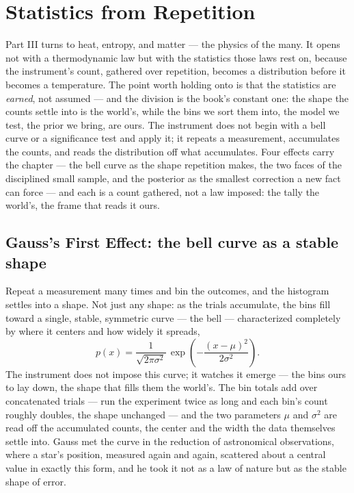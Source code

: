 \chapter{Statistics from Repetition}
\label{chap:statistics-from-repetition}

Part III turns to heat, entropy, and matter --- the physics of the many. It opens not with a thermodynamic
law but with the statistics those laws rest on, because the instrument's count, gathered over repetition,
becomes a distribution before it becomes a temperature. The point worth holding onto is that the statistics
are \emph{earned}, not assumed --- and the division is the book's constant one: the shape the counts settle
into is the world's, while the bins we sort them into, the model we test, the prior we bring, are ours. The
instrument does not begin with a bell curve or a significance test and apply it; it repeats a measurement,
accumulates the counts, and reads the distribution off what accumulates. Four effects carry the chapter --- the
bell curve as the shape repetition makes, the two faces of the disciplined small sample, and the posterior as
the smallest correction a new fact can force --- and each is a count gathered, not a law imposed: the tally the
world's, the frame that reads it ours.

\section{Gauss's First Effect: the bell curve as a stable shape}
\label{se:gauss-first}

Repeat a measurement many times and bin the outcomes, and the histogram settles into a shape. Not just any
shape: as the trials accumulate, the bins fill toward a single, stable, symmetric curve --- the bell ---
characterized completely by where it centers and how widely it spreads,
\begin{equation}
  p(x) = \frac{1}{\sqrt{2\pi\sigma^2}}\,\exp\!\left(-\frac{(x-\mu)^2}{2\sigma^2}\right).
\end{equation}
The instrument does not impose this curve; it watches it emerge --- the bins ours to lay down, the shape that
fills them the world's. The bin totals add over concatenated trials
--- run the experiment twice as long and each bin's count roughly doubles, the shape unchanged --- and the
two parameters $\mu$ and $\sigma^2$ are read off the accumulated counts, the center and the width the data
themselves settle into. Gauss met the curve in the reduction of astronomical observations, where a star's
position, measured again and again, scattered about a central value in exactly this form, and he took it not
as a law of nature but as the stable shape of error.

